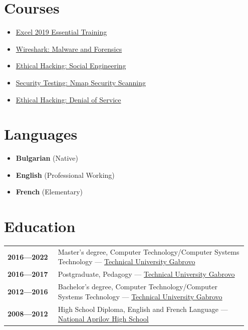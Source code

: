 \documentclass[letterpaper,10pt]{article}
\begin{document}
\begin{center}
	\begin{minipage}[t]{0.5\textwidth}
		\section*{Courses}
		\begin{itemize}
			\item \href{https://raw.githubusercontent.com/svetlyobg/LaTeX-CV/main/Excel%202019%20Essential%20Training.png}{Excel 2019 Essential Training}
			\item \href {https://raw.githubusercontent.com/svetlyobg/LaTeX-CV/main/Wireshark%20Malware%20and%20Forensics.png}{Wireshark: Malware and Forensics}
			\item \href{https://raw.githubusercontent.com/svetlyobg/LaTeX-CV/main/EthicalHackingSocialEngineering.png}{Ethical Hacking: Social Engineering}
			\item \href{}{Security Testing: Nmap Security Scanning}
			\item \href{}{Ethical Hacking: Denial of Service}
		\end{itemize}
	\end{minipage}%
	\begin{minipage}[t]{0.5\textwidth}
		\section*{Languages}
		\begin{itemize}
			\item \textbf{Bulgarian} (Native)
			\item \textbf{English} (Professional Working)
			\item \textbf{French} (Elementary)
		\end{itemize}
		\newpage
		\section*{Education}
		\begin{tabular}{@{}p{0.2\linewidth} p{0.75\linewidth}}
			\textbf{2016—2022} & Master's degree, Computer Technology/Computer Systems Technology — \href{https://www.tugab.bg/en/}{Technical University Gabrovo} \\
			\textbf{2016—2017} & Postgraduate, Pedagogy — \href{https://www.tugab.bg/en/}{Technical University Gabrovo} \\
			\textbf{2012—2016} & Bachelor's degree, Computer Technology/Computer Systems Technology — \href{https://www.tugab.bg/en/}{Technical University Gabrovo} \\
			\textbf{2008—2012} & High School Diploma, English and French Language — \href{https://nag-school.org/}{National Aprilov High School} \\
		\end{tabular}
	\end{minipage}
\end{center}
			
\end{document}
